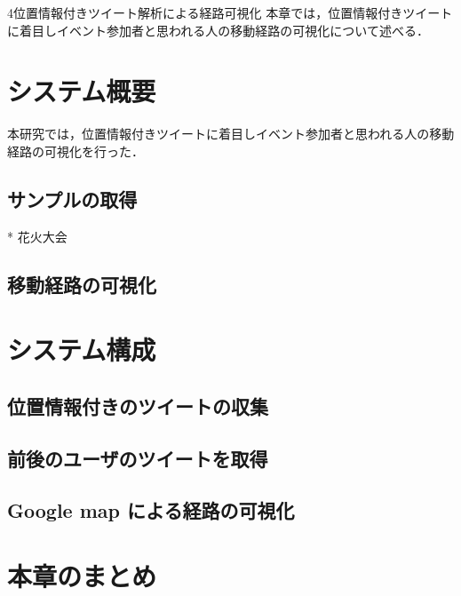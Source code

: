 \chapterhead
{4}{位置情報付きツイート解析による経路可視化}
{本章では，位置情報付きツイートに着目しイベント参加者と思われる人の移動経路の可視化について述べる．}


\section{システム概要}
本研究では，位置情報付きツイートに着目しイベント参加者と思われる人の移動経路の可視化を行った．

\subsection{サンプルの取得}
* 花火大会
\subsection{移動経路の可視化}

\section{システム構成}
\subsection{位置情報付きのツイートの収集}
\subsection{前後のユーザのツイートを取得}
\subsection{Google map による経路の可視化}

\newpage

\section{本章のまとめ}





\newpage
